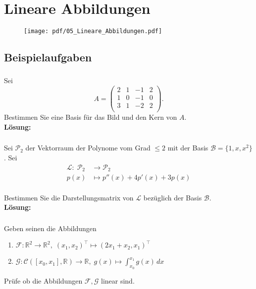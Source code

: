 \section{Lineare Abbildungen}
\begin{figure}[h!]
    \texttt{[image: pdf/05\_Lineare\_Abbildungen.pdf]}
\end{figure}
\newpage


\subsection{Beispielaufgaben} %
\vspace{1cm}
\subsubsection{} %
Sei
\[
A = \begin{pmatrix}
2 & 1 & -1 & 2 \\
1 & 0 & -1 & 0 \\
3 & 1 & -2 & 2 \\
\end{pmatrix}.
\]
Bestimmen Sie eine Basis für das Bild und den Kern von $A$. \\

\noindent \textbf{Lösung:}
\vspace{5cm}

\subsubsection{} %
Sei $\mathcal{P}_2$ der Vektorraum der Polynome vom Grad $\leq 2$ mit der Basis $\mathcal{B} = \{1,x,x^2\}$. Sei
\[\begin{aligned}
\mathcal{L}: \; \mathcal{P}_2 &\rightarrow \mathcal{P}_2 \\
p(x) &\mapsto p''(x)+4p'(x)+3p(x)
\end{aligned}\] \\
Bestimmen Sie die Darstellungsmatrix von $\mathcal{L}$ bezüglich der Basis $\mathcal{B}$.\\

\noindent \textbf{Lösung:}

\newpage
\subsubsection{}
Geben seinen die Abbildungen
\begin{enumerate}[label=\alph*)]
    \item $\mathcal{F}: \mathbb{R}^2 \rightarrow \mathbb{R}^2,\; (x_1,x_2)^\top \mapsto (2x_1+x_2,x_1)^\top $
    \item $\mathcal{G}: \mathcal{C} ([x_0,x_1], \mathbb{R}) \rightarrow \mathbb{R},\; g(x) \mapsto \int_{x_0}^{x_1} g(x) \,dx$
\end{enumerate}
Prüfe ob die Abbildungen $\mathcal{F,G}$ linear sind.\\

